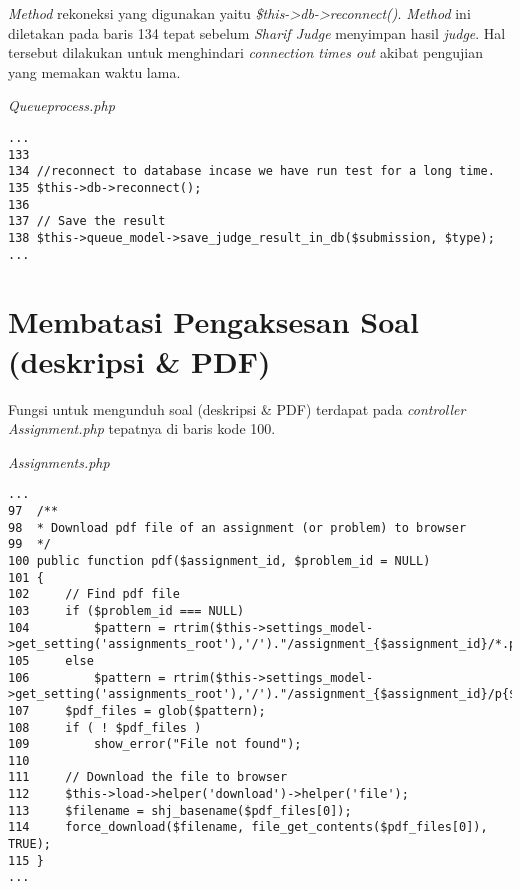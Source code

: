 \textit{Method} rekoneksi yang digunakan yaitu \textit{\$this->db->reconnect()}. \textit{Method} ini diletakan pada baris 134 tepat sebelum \textit{Sharif Judge} menyimpan hasil \textit{judge}. Hal tersebut dilakukan untuk menghindari \textit{connection times out} akibat pengujian yang memakan waktu lama.

\textit{Queueprocess.php}
\begin{lstlisting}[basicstyle=\ttfamily, frame=single,
columns=fullflexible, keepspaces=true]
...
133
134	//reconnect to database incase we have run test for a long time.
135	$this->db->reconnect();
136
137	// Save the result
138	$this->queue_model->save_judge_result_in_db($submission, $type);
...
\end{lstlisting}

\section{Membatasi Pengaksesan Soal (deskripsi \& PDF)}%
\label{chap:batassoal}
Fungsi untuk mengunduh soal (deskripsi \& PDF) terdapat pada \textit{controller Assignment.php} tepatnya di baris kode 100.

\textit{Assignments.php}
\begin{lstlisting}[basicstyle=\ttfamily, frame=single,
columns=fullflexible, keepspaces=true, breaklines=true]
...
97	/**
98	* Download pdf file of an assignment (or problem) to browser
99	*/
100	public function pdf($assignment_id, $problem_id = NULL)
101	{
102		// Find pdf file
103		if ($problem_id === NULL)
104			$pattern = rtrim($this->settings_model->get_setting('assignments_root'),'/')."/assignment_{$assignment_id}/*.pdf";
105		else
106			$pattern = rtrim($this->settings_model->get_setting('assignments_root'),'/')."/assignment_{$assignment_id}/p{$problem_id}/*.pdf";
107		$pdf_files = glob($pattern);
108		if ( ! $pdf_files )
109			show_error("File not found");
110
111		// Download the file to browser
112		$this->load->helper('download')->helper('file');
113		$filename = shj_basename($pdf_files[0]);
114		force_download($filename, file_get_contents($pdf_files[0]), TRUE);
115	}
...
\end{lstlisting}

